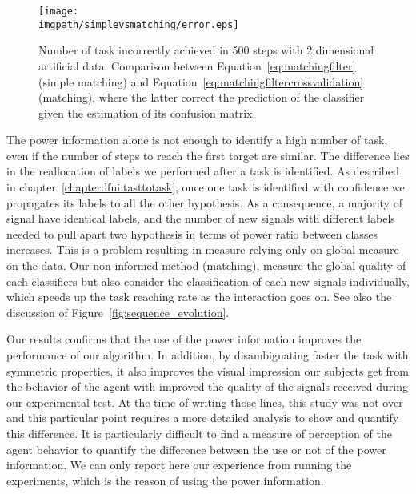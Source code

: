 \begin{figure}[!ht]
\centering
\texttt{[image: \\imgpath/simplevsmatching/error.eps]}
\caption{Number of task incorrectly achieved in 500 steps with 2 dimensional artificial data. Comparison between Equation~\ref{eq:matchingfilter} (simple matching) and Equation~\ref{eq:matchingfiltercrossvalidation} (matching), where the latter correct the prediction of the classifier given the estimation of its confusion matrix.
}
\label{fig:nWrongEEG_simplevsmatching}
\end{figure} 


The power information alone is not enough to identify a high number of task, even if the number of steps to reach the first target are similar. The difference lies in the reallocation of labels we performed after a task is identified. As described in chapter~\ref{chapter:lfui:tasttotask}, once one task is identified with confidence we propagates its labels to all the other hypothesis. As a consequence, a majority of signal have identical labels, and the number of new signals with different labels needed to pull apart two hypothesis in terms of power ratio between classes increases. This is a problem resulting in measure relying only on global measure on the data. Our non-informed method (matching), measure the global quality of each classifiers but also consider the classification of each new signals individually, which speeds up the task reaching rate as the interaction goes on. See also the discussion of Figure~\ref{fig:sequence_evolution}.


Our results confirms that the use of the power information improves the performance of our algorithm. In addition, by disambiguating faster the task with symmetric properties, it also improves the visual impression our subjects get from the behavior of the agent with improved the quality of the signals received during our experimental test. At the time of writing those lines, this study was not over and this particular point requires a more detailed analysis to show and quantify this difference. It is particularly difficult to find a measure of perception of the agent behavior to quantify the difference between the use or not of the power information. We can only report here our experience from running the experiments, which is the reason of using the power information.


